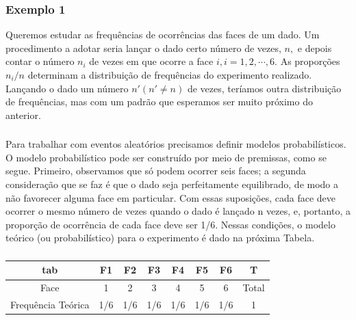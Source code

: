 \documentclass[14pt,aspectratio=1610]{beamer}
\begin{document}
\begin{frame}{}
\frametitle{Exemplo 1}
\begin{block}{}
\justifying
Queremos estudar as frequências de ocorrências das faces de um dado. Um procedimento a adotar seria lançar o dado certo número de vezes, $n,$ e depois contar o número $n_{i}$ de vezes em que ocorre a face $i, i = 1, 2,\cdots, 6.$ As proporções $n_{i}/n$
determinam a distribuição de frequências do experimento realizado. Lançando o dado
um número $n'(n'\neq n)$ de vezes, teríamos outra distribuição de frequências, mas com um padrão que esperamos ser muito próximo do anterior.

\end{block}
\end{frame}

\begin{frame}{}
\frametitle{}
\begin{block}{}
\justifying
Para trabalhar com eventos aleatórios precisamos definir modelos probabilísticos. O modelo probabilístico pode ser construído por meio de premissas, como se segue.
Primeiro, observamos que só podem ocorrer seis faces; a segunda consideração que
se faz é que o dado seja perfeitamente equilibrado, de modo a não favorecer alguma face em particular. Com essas suposições, cada face deve ocorrer o mesmo número de vezes quando o dado é lançado n vezes, e, portanto, a proporção de ocorrência de cada face deve ser 1/6. Nessas condições, o modelo teórico (ou probabilístico) para o experimento é dado na próxima Tabela.
\end{block}
\end{frame}

\begin{frame}[fragile]{}
\frametitle{}
\begin{block}{}
\justifying
\begin{table}[]
    \centering
    \begin{tabular}{c|cccccc|c}
\hline
                tab&  F1&  F2&  F3&  F4&  F5&  F6&     T\\
\hline                
               Face&   1&   2&   3&   4&   5&   6& Total\\
\hline               
 Frequência Teórica& 1/6& 1/6& 1/6& 1/6& 1/6& 1/6&     1\\
 \hline
    \end{tabular}
    \label{tab:my_label}
\end{table}


\end{block}
\end{frame}
\end{document}
